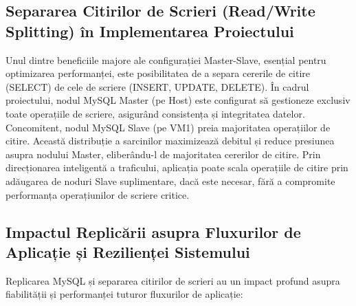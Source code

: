 \documentclass[12pt, a4paper, oneside, romanian]{teza-upb}
\begin{document}
\subsection*{Separarea Citirilor de Scrieri (Read/Write Splitting) în Implementarea Proiectului}
Unul dintre beneficiile majore ale configurației Master-Slave, esențial pentru optimizarea performanței, este posibilitatea de a separa cererile de citire (SELECT) de cele de scriere (INSERT, UPDATE, DELETE). În cadrul proiectului, nodul MySQL Master (pe Host) este configurat să gestioneze exclusiv toate operațiile de scriere, asigurând consistența și integritatea datelor. Concomitent, nodul MySQL Slave (pe VM1) preia majoritatea operațiilor de citire. Această distribuție a sarcinilor maximizează debitul și reduce presiunea asupra nodului Master, eliberându-l de majoritatea cererilor de citire. Prin direcționarea inteligentă a traficului, aplicația poate scala operațiile de citire prin adăugarea de noduri Slave suplimentare, dacă este necesar, fără a compromite performanța operațiunilor de scriere critice.

\subsection*{Impactul Replicării asupra Fluxurilor de Aplicație și Rezilienței Sistemului}
Replicarea MySQL și separarea citirilor de scrieri au un impact profund asupra fiabilității și performanței tuturor fluxurilor de aplicație:
\end{document}
